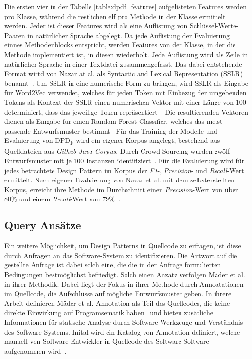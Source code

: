 Die ersten vier in der Tabelle \ref{table:dpdf_features} aufgelisteten Features werden pro Klasse, während die restlichen elf pro Methode in der Klasse ermittelt werden.
Jeder ist dieser Features wird als eine Auflistung von Schlüssel-Werte-Paaren in natürlicher Sprache abgelegt.
Da jede Auflistung der Evaluierung einnes Methodenblocks entspricht, werden Features von der Klasse, in der die Methode implementiert ist, in diesen wiederholt.
Jede Auflistung wird als Zeile in natürlicher Sprache in einer Textdatei zusammengefasst. Das dabei entstehende Format wirtd von Nazar at al. als Syntactic and Lexical Representation (SSLR) benannt~\cite[S. 1]{Nazar2020}.
Um SSLR in eine numerische Form zu bringen, wird SSLR als Eingabe für Word2Vec verwendet, welches für jeden Token mit Einbezug der umgebenden Tokens als Kontext der SSLR einen numerischen Vektor mit einer Länge von 100 determiniert, dass das jeweilige Token repräsentiert~\cite[S. 6]{Nazar2020}.
Die resultierenden Vektoren dienen als Eingabe für einen Random Forest Classifier, welches das meist passende Entwurfsmuster bestimmt~\cite[S. 7]{Nazar2020}
Für das Training der Modelle und Evaluierung von DPD\textsubscript{F} wird ein eigener Korpus angelegt, bestehend aus Quelldateien aus \textit{Github Java Corpus}. Durch Crowd-Sourcing wurden zwölf Entwurfsmuster mit je 100 Instanzen identifiziert~\cite[S. 4]{Nazar2020}.
Für die Evaluierung wird für jedes betrachtete Design Pattern im Korpus der \textit{F1}-, \textit{Precision}- und \textit{Recall}-Wert ermittelt. Nach eigener Evaluierung von Nazar et al. mit dem selbsterstellten Korpus, erreicht ihre Methode im Durchschnitt einen \textit{Precision}-Wert von über 80\% und einem \textit{Recall}-Wert von 79\%~\cite[S. 8]{Nazar2020}.   


\subsection{Query Ansätze}

Ein weitere Möglichkeit, um Design Patterns in Quellcode zu erfragen, ist diese durch Anfragen an das Software-System zu identifizieren.
Die Antwort auf die gestellte Anfrage ist dabei solch eine, die die in der Anfrage formulierten Bedingungen bestmöglichst befriedigt.
Solch einen Anzatz verfolgen Mäder et al. in ihrer Methodik. Dabei liegt der Fokus in ihrer Methode durch Annoatationen im Quellcode,
die Aufschlüsse auf mögliche Entwurfsmuster geben. In ihrere Arbeit definieren Mäder et al. Annotation als Teil des Quellcodes, die keine direkte Einwirkung
auf Programsematik haben~\cite[S. 521]{Ghula-2010} und bieten zusätliche Informationen für statische Analyse durch Software-Werkzeuge und Verständnis des Software-Systems.
Inital wird ein Katalog von Annotation definiert, welche manuell von Software-Entwickler in Quellcode des Software-Software aufgenommen wird~\cite[S. 521]{Ghula-2010}.

